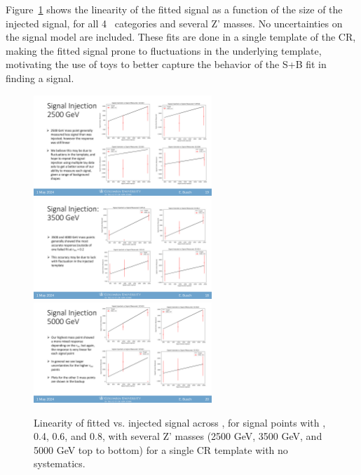 Figure~\ref{fig:siginj_linearity} shows the linearity of the fitted signal as a function of the size of the injected signal, for all 4 \rinv~categories and several Z' masses.
No uncertainties on the signal model are included.
These fits are done in a single template of the CR, making the fitted signal prone to fluctuations in the underlying template, motivating the use of toys to better capture the behavior of the S+B fit in finding a signal.
\begin{figure}[!htbp]
\centering
   \includegraphics[width=0.6\textwidth]{figures/stats/siginj_m2500}
   \includegraphics[width=0.6\textwidth]{figures/stats/siginj_m3500}
   \includegraphics[width=0.6\textwidth]{figures/stats/siginj_m5000}
   \caption{Linearity of fitted vs. injected signal across \mt, for signal points with , 0.4, 0.6, and 0.8, with several Z' masses (2500 GeV, 3500 GeV, and 5000 GeV top to bottom) for a single CR template with no systematics.
    \label{fig:siginj_linearity}}
\end{figure}

